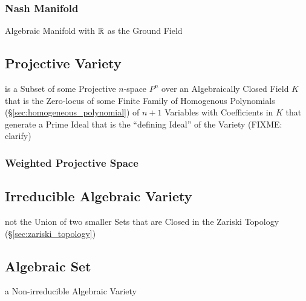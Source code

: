 \subsubsection{Nash Manifold}\label{sec:nash_manifold}

Algebraic Manifold with $\mathbb{R}$ as the Ground Field



\subsection{Projective Variety}\label{sec:projective_variety}

is a Subset of some Projective $n$-space $\xspace{P}^n$ over an Algebraically
Closed Field $K$ that is the Zero-locus of some Finite Family of Homogenous
Polynomials (\S\ref{sec:homogeneous_polynomial}) of $n + 1$ Variables with
Coefficients in $K$ that generate a Prime Ideal that is the ``defining Ideal''
of the Variety (FIXME: clarify)



\subsubsection{Weighted Projective Space}\label{sec:weighted_projective_space}



\subsection{Irreducible Algebraic Variety}
\label{sec:irreducible_algebraic_variety}

not the Union of two smaller Sets that are Closed in the Zariski Topology
(\S\ref{sec:zariski_topology})



\subsection{Algebraic Set}\label{sec:algebraic_set}

a Non-irreducible Algebraic Variety

